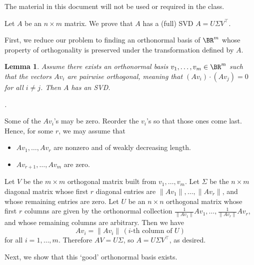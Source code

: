\documentclass[10pt]{amsart}
\makeatletter
\renewenvironment{proof}[1][\proofname]{\par
	\pushQED{\qed}%
	\normalfont \topsep6\p@\@plus6\p@\relax
	\noindent\emph{#1.} 
	\ignorespaces
}{%
\popQED\endtrivlist\@endpefalse
}
\theoremstyle{mythm}
\newtheorem{lem}[thm]{Lemma}
\theoremstyle{definition}
\theoremstyle{myrmk}
\makeatother
\begin{document}
	\thispagestyle{fancy}
	
	{\color{blue} The material in this document will not be used or required in the class. } 
	
	Let $A$ be an $n \times m$ matrix. We prove that $A$ has a (full) SVD $A = U\Sigma V^\top$. 
	
	First, we reduce our problem to finding an orthonormal basis of $\BR^m$ whose property of orthogonality is preserved under the transformation defined by $A$. 
	
	\begin{lem}
		Assume there exists an orthonormal basis $v_1, \ldots, v_m \in \BR^m$ such that the vectors $Av_i$ are pairwise orthogonal, meaning that $(Av_i) \cdot (Av_j) = 0$ for all $i \neq j$. Then $A$ has an SVD. 
	\end{lem}
	\begin{proof}
		Some of the $Av_i$'s may be zero. Reorder the $v_i$'s so that those ones come last. Hence, for some $r$, we may assume that 
		\begin{itemize}
			\item $Av_1, \ldots, Av_r$ are nonzero and of weakly decreasing length. 
			\item $Av_{r+1}, \ldots, Av_m$ are zero. 
		\end{itemize}
		Let $V$ be the $m \times m$ orthogonal matrix built from $v_1, \ldots, v_m$. Let $\Sigma$ be the $n \times m$ diagonal matrix whose first $r$ diagonal entries are $\lVert Av_1\rVert, \ldots, \lVert Av_r\rVert$, and whose remaining entries are zero. Let $U$ be an $n \times n$ orthogonal matrix whose first $r$ columns are given by the orthonormal collection $\frac{1}{\lVert Av_1\rVert} Av_1, \ldots, \frac{1}{\lVert Av_r\rVert} Av_r$, and whose remaining columns are arbitrary. Then we have 
		\[
			Av_i = \lVert Av_i \rVert \, (i\text{-th column of } U)
		\]
		for all $i = 1, \ldots, m$. Therefore $AV = U \Sigma$, so $A = U \Sigma V^\top$, as desired. 
	\end{proof}
	
	Next, we show that this `good' orthonormal basis exists. 
	
\end{document}
